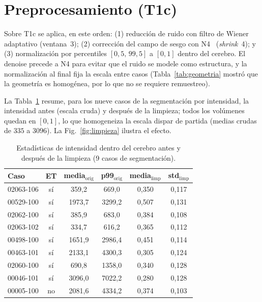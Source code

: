 \documentclass[conference]{IEEEtran}
\begin{document}
\section{Preprocesamiento (T1c)}
\label{sec:limpieza}
Sobre T1c se aplica, en este orden: (1) reducción de ruido con
filtro de Wiener adaptativo (ventana~3); (2) corrección del campo
de sesgo con N4~\cite{tustison2010n4} (\textit{shrink}~4); y
(3) normalización por percentiles $[0{,}5,\,99{,}5]$ a $[0,1]$
dentro del cerebro. El denoise precede a N4 para evitar que el
ruido se modele como estructura, y la normalización al final fija
la escala entre casos (Tabla~\ref{tab:geometria} mostró que la
geometría es homogénea, por lo que no se requiere remuestreo).

La Tabla~\ref{tab:limpieza} resume, para los nueve casos de la
segmentación por intensidad, la intensidad antes (escala cruda) y después
de la limpieza; todos los volúmenes quedan en $[0,1]$, lo que homogeneiza
la escala dispar de partida (medias crudas de $335$ a $3096$).
La Fig.~\ref{fig:limpieza} ilustra el efecto.

\begin{table}[h]
\centering
\caption{Estadísticas de intensidad dentro del cerebro antes y
después de la limpieza (9 casos de segmentación).}
\label{tab:limpieza}
\begin{tabular}{lccccc}
\toprule
Caso & ET & media$_\text{orig}$ & p99$_\text{orig}$ & media$_\text{limp}$ & std$_\text{limp}$ \\
\midrule
02063-106 & sí & 359,2  & 669,0  & 0,350 & 0,117 \\
00529-100 & sí & 1973,7 & 3299,2 & 0,507 & 0,131 \\
02062-100 & sí & 385,9  & 683,0  & 0,384 & 0,108 \\
02063-102 & sí & 334,7  & 616,2  & 0,365 & 0,112 \\
00498-100 & sí & 1651,9 & 2986,4 & 0,451 & 0,114 \\
00463-101 & sí & 2133,1 & 4300,3 & 0,305 & 0,124 \\
02060-100 & sí & 690,8  & 1358,0 & 0,340 & 0,128 \\
00046-101 & sí & 3096,0 & 7022,2 & 0,280 & 0,128 \\
00005-100 & no & 2081,6 & 4334,2 & 0,374 & 0,103 \\
\bottomrule
\end{tabular}
\end{table}
\end{document}
